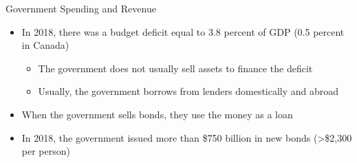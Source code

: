 \documentclass[aspectratio=1610]{beamer}
\begin{document}
\begin{frame}[wide]{Government Spending and Revenue}
	\begin{itemize}
		\item In 2018, there was a budget deficit equal to 3.8 percent of GDP (0.5 percent in Canada)
		\vspace{2mm}
		\begin{itemize}
			\item The government does not usually sell assets to finance the deficit
			\item Usually, the government borrows from lenders domestically and abroad
		\end{itemize}
		\vspace{5mm}
		\item When the government sells bonds, they use the money as a loan
		\vspace{5mm}
		\item In 2018, the government issued more than \$750 billion in new bonds (>\$2,300 per person)
	\end{itemize}
\end{frame}
\end{document}
